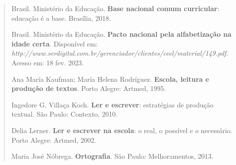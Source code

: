 \begin{quote}
Brasil. Ministério da Educação. \textbf{Base nacional comum curricular}:
educação é a base. Brasília, 2018.

Brasil. Ministério da Educação. \textbf{Pacto nacional pela
alfabetização na idade certa}. Disponível em:
\emph{http://www.serdigital.com.br/gerenciador/clientes/ceel/material/149.pdf}.
Acesso em: 18 fev. 2023.

Ana María Kaufman; María Helena Rodríguez. \textbf{Escola, leitura e
produção de textos}. Porto Alegre: Artmed, 1995.

Ingedore G. Villaça Koch. \textbf{Ler e escrever}: estratégias de
produção textual. São Paulo: Contexto, 2010.

Delia Lerner. \textbf{Ler e escrever na escola}: o real, o possível e o
necessário. Porto Alegre: Artmed, 2002.

Maria José Nóbrega. \textbf{Ortografia}. São Paulo: Melhoramentos, 2013.
\end{quote}
